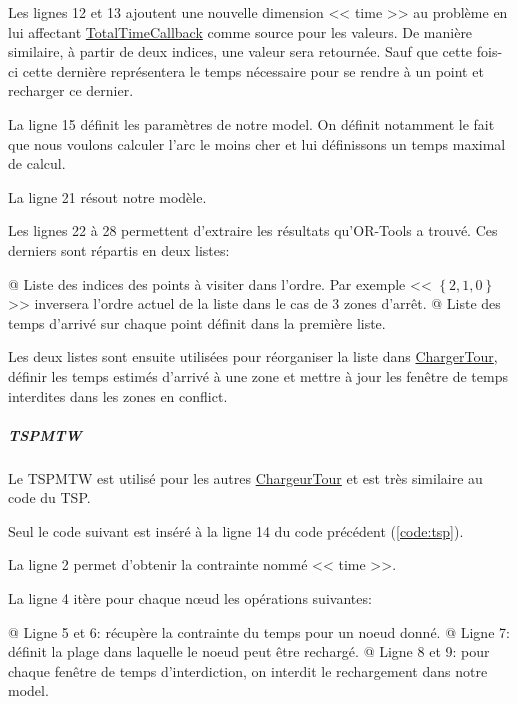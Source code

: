 \documentclass[final]{polytech/polytech}
\newcommand{\klass}[1]{\hyperref[class:#1]{#1}}
\begin{document}
						Les lignes 12 et 13 ajoutent une nouvelle dimension << time >> au problème en lui affectant \klass{TotalTimeCallback} comme source pour les valeurs.
						De manière similaire, à partir de deux indices, une valeur sera retournée.
						Sauf que cette fois-ci cette dernière représentera le temps nécessaire pour se rendre à un point et recharger ce dernier.
						
						La ligne 15 définit les paramètres de notre model.
						On définit notamment le fait que nous voulons calculer l'arc le moins cher et lui définissons un temps maximal de calcul.
						
						La ligne 21 résout notre modèle.
						
						Les lignes 22 à 28 permettent d'extraire les résultats qu'OR-Tools a trouvé.
						Ces derniers sont répartis en deux listes:
						\begin{easylist}
							@ Liste des indices des points à visiter dans l'ordre. Par exemple << $\left\{ 2,1,0 \right\}$ >> inversera l'ordre actuel de la liste dans le cas de 3 zones d'arrêt.
							@ Liste des temps d'arrivé sur chaque point définit dans la première liste.
						\end{easylist}
						
						Les deux listes sont ensuite utilisées pour réorganiser la liste dans \klass{ChargerTour}, définir les temps estimés d'arrivé à une zone et mettre à jour les fenêtre de temps interdites dans les zones en conflict.
							
					\subparagraph{TSPMTW}
						Le TSPMTW est utilisé pour les autres \klass{ChargeurTour} et est très similaire au code du TSP.
						
						Seul le code suivant est inséré à la ligne 14 du code précédent (\autoref{code:tsp}).
						
						
						La ligne 2 permet d'obtenir la contrainte nommé << time >>.
						
						La ligne 4 itère pour chaque n\oe ud les opérations suivantes:
						\begin{easylist}
							@ Ligne 5 et 6: récupère la contrainte du temps pour un noeud donné.
							@ Ligne 7: définit la plage dans laquelle le noeud peut être rechargé.
							@ Ligne 8 et 9: pour chaque fenêtre de temps d'interdiction, on interdit le rechargement dans notre model.
						\end{easylist}
						
\end{document}
